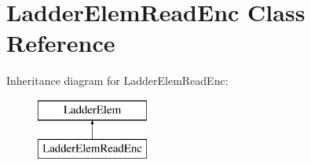 \hypertarget{class_ladder_elem_read_enc}{\section{Ladder\-Elem\-Read\-Enc Class Reference}
\label{class_ladder_elem_read_enc}
}
Inheritance diagram for Ladder\-Elem\-Read\-Enc\-:\begin{figure}[H]
\begin{center}
\leavevmode
\includegraphics[height=2.000000cm]{class_ladder_elem_read_enc}
\end{center}
\end{figure}
